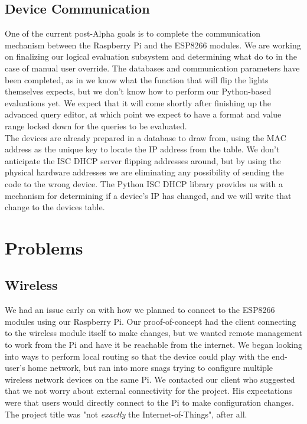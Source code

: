 \documentclass[oneside,openright]{book}
\begin{document}
\subsection{Device Communication}
One of the current post-Alpha goals is to complete the communication mechanism between the Raspberry Pi and the ESP8266 modules. We are working on finalizing our logical evaluation subsystem and determining what do to in the case of manual user override. The databases and communication parameters have been completed, as in we know what the function that will flip the lights themselves expects, but we don't know how to perform our Python-based evaluations yet. We expect that it will come shortly after finishing up the advanced query editor, at which point we expect to have a format and value range locked down for the queries to be evaluated.\\

The devices are already prepared in a database to draw from, using the MAC address as the unique key to locate the IP address from the table. We don't anticipate the ISC DHCP server flipping addresses around, but by using the physical hardware addresses we are eliminating any possibility of sending the code to the wrong device. The Python ISC DHCP library provides us with a mechanism for determining if a device's IP has changed, and we will write that change to the devices table.
\section{Problems}
\subsection{Wireless}
We had an issue early on with how we planned to connect to the ESP8266 modules using our Raspberry Pi. Our proof-of-concept had the client connecting to the wireless module itself to make changes, but we wanted remote management to work from the Pi and have it be reachable from the internet. We began looking into ways to perform local routing so that the device could play with the end-user's home network, but ran into more snags trying to configure multiple wireless network devices on the same Pi. We contacted our client who suggested that we not worry about external connectivity for the project. His expectations were that users would directly connect to the Pi to make configuration changes. The project title was "not \textit{exactly} the Internet-of-Things", after all.\\
\end{document}
